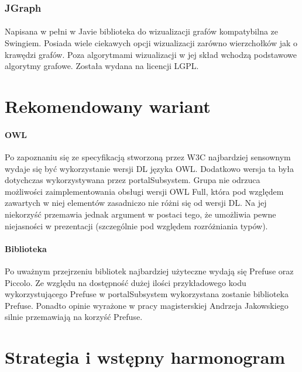 \documentclass[a4paper,10pt]{article}
\begin{document}
\subsubsection{JGraph}
\paragraph{} Napisana w pełni w Javie biblioteka do wizualizacji grafów kompatybilna ze Swingiem. Posiada wiele ciekawych opcji wizualizacji zarówno wierzchołków jak o krawędzi grafów. Poza algorytmami wizualizacji w jej skład wchodzą podstawowe algorytmy grafowe. Została wydana na licencji LGPL.


\section{Rekomendowany wariant}


\paragraph{OWL} Po zapoznaniu się ze specyfikacją stworzoną przez W3C najbardziej sensownym wydaje się być wykorzystanie wersji DL języka OWL. Dodatkowo wersja ta była dotychczas wykorzystywana przez portalSubsystem. Grupa nie odrzuca możliwości zaimplementowania obsługi wersji OWL Full, która pod względem zawartych w niej elementów zasadniczo nie różni się od wersji DL. Na jej niekorzyść przemawia jednak argument w postaci tego, że umożliwia pewne niejasności w prezentacji (szczególnie pod względem rozróżniania typów).

\paragraph{Biblioteka }Po uważnym przejrzeniu bibliotek najbardziej użyteczne wydają się Prefuse oraz Piccolo. Ze względu na dostępność dużej ilości przykładowego kodu wykorzystującego Prefuse w portalSubsystem wykorzystana zostanie biblioteka Prefuse. Ponadto opinie wyrażone w pracy magisterskiej Andrzeja Jakowskiego silnie przemawiają na korzyść Prefuse.


\section{Strategia i wstępny harmonogram}
\end{document}
